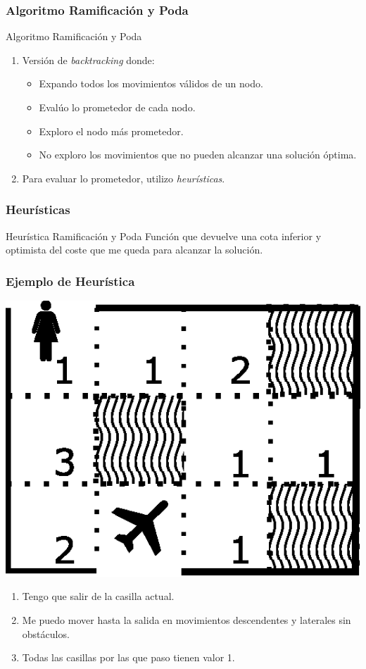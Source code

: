\documentclass[a4paper,t,xcolor=pst,dvips,colortheme]{beamer}
\begin{document}
\begin{frame}[c]
    \frametitle{Algoritmo Ramificación y Poda}
    \begin{block}{Algoritmo Ramificación y Poda}
        \begin{enumerate}[<+->]
            \item Versión de \emph{backtracking} donde:
            \begin{itemize}
                \item Expando todos los movimientos válidos de un nodo.
                \item Evalúo lo prometedor de cada nodo.
                \item Exploro el nodo más prometedor.
                \item No exploro los movimientos que no pueden alcanzar una solución óptima.
            \end{itemize}
            \item Para evaluar lo prometedor, utilizo \emph{heurísticas}.
        \end{enumerate}
    \end{block}
\end{frame}

\begin{frame}[c]
    \frametitle{Heurísticas}
    \begin{block}{Heurística Ramificación y Poda}
        Función que devuelve una cota inferior y optimista del coste que me queda para alcanzar la solución.
    \end{block}
\end{frame}

\begin{frame}[c]
    \frametitle{Ejemplo de Heurística}
    \begin{center}
        \includegraphics[width=0.25\linewidth]{images/backtracking/laberinto.eps}
    \end{center}
    \begin{enumerate}[<+->]
        \item Tengo que salir de la casilla actual.
        \item Me puedo mover hasta la salida en movimientos descendentes y laterales sin obstáculos.
        \item Todas las casillas por las que paso tienen valor 1.
    \end{enumerate}
\end{frame}
\end{document}
